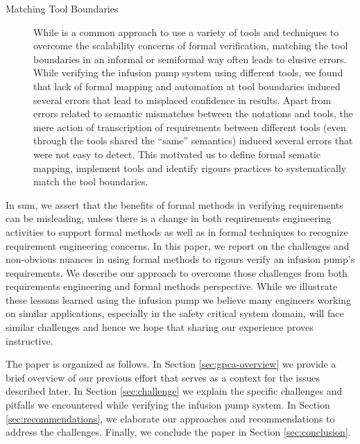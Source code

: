 \begin{description}
    \item[Matching Tool Boundaries] While is a common approach to use a variety of tools and techniques to overcome the scalability concerns of formal verification, matching the tool boundaries in an informal or semiformal way often leads to elusive errors. While verifying the infusion pump system using different tools, we found that lack of formal mapping and automation at tool boundaries induced several errors that lead to misplaced confidence in results. Apart from errors related to semantic mismatches between the notations and tools, the mere action of transcription of requirements between different tools (even through the tools shared the “same” semantics) induced several errors that were not easy to detect. This motivated us to define formal sematic mapping, implement tools and identify rigours practices to systematically match the tool boundaries.
\end{description}

In sum, we assert that the benefits of formal methods in verifying requirements can be misleading, unless there is a change in both requirements engineering activities to support formal methods as well as in formal techniques to recognize requirement engineering concerns. In this paper, we report on the challenges and non-obvious nuances in using formal methods to rigours verify an infusion pump's requirements. We describe our approach to overcome those challenges from both requirements engineering and formal methods perspective. While we illustrate these lessons learned using the infusion pump we believe many engineers working on similar applications, especially in the safety critical system domain, will face similar challenges and hence we hope that sharing our experience proves instructive. %

The paper is organized as follows. In Section \ref{sec:gpca-overview} we provide a brief overview of our previous effort that serves as a context for the issues described later. In Section \ref{sec:challenge} we explain the specific challenges and pitfalls we encountered while verifying the infusion pump system. In Section \ref{sec:recommendations}, we elaborate our approaches and recommendations to address the challenges. Finally, we conclude the paper in Section \ref{sec:conclusion}.
\iffalse

